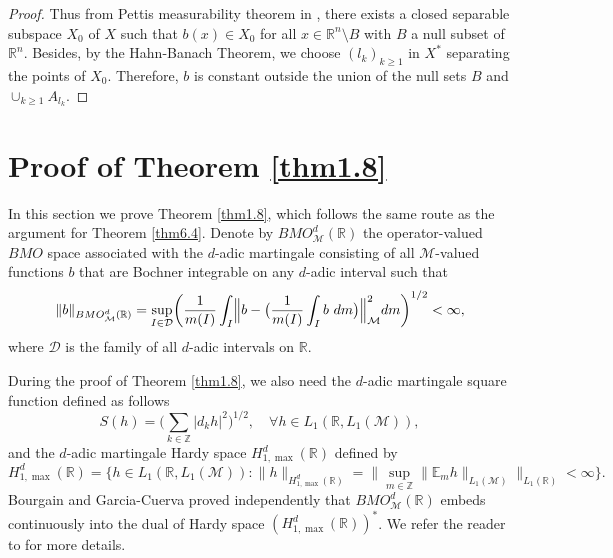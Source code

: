 \documentclass[oneside,english,a4wide]{amsart}
\numberwithin{equation}{section}
\numberwithin{figure}{section}
\theoremstyle{plain}
\theoremstyle{plain}
\theoremstyle{definition}
\theoremstyle{plain}
\theoremstyle{remark}
\theoremstyle{definition}
\theoremstyle{remark}
\theoremstyle{definition}
\newcommand{\8}{\infty}
\begin{document}
\begin{proof}
	Thus from Pettis measurability theorem in \cite[Theorem II.1.2]{DU}, there exists a closed separable subspace $X_0$ of $X$ such that $b(x)\in X_0$ for all $x\in \mathbb{R}^n\setminus B$ with $B$ a null subset of $\mathbb{R}^n$. Besides, by the Hahn-Banach Theorem, we choose $(l_k)_{k\ge 1}$ in $X^*$ separating the points of $X_0$.   Therefore, $b$ is constant outside the union of the null sets $B$ and $\cup_{k\ge 1}A_{l_k}$.
\end{proof}


 

\bigskip

\section{Proof of Theorem \ref{thm1.8}}\label{pthm1.8}

In this section we prove Theorem \ref{thm1.8}, which follows the same route as the argument for Theorem \ref{thm6.4}. Denote by $BMO^d_{\mathcal{M}}(\mathbb{R})$ the operator-valued $BMO$ space associated with the $d$-adic martingale consisting of all $\mathcal{M}$-valued functions $b$ that are Bochner integrable on any $d$-adic interval such that
\begin{equation}\label{BMOMd}
	\|b\|_{BMO^d_\mathcal{M}(\mathbb{R})}=\sup_{I\in \mathcal{D}}\biggl(\frac{1}{m(I)}\int_I \Bigl\|b-\big(\frac{1}{m(I)} \int_I b\ d m\big)\Bigr\|_\mathcal{M}^2 dm\biggr)^{1/2}<\infty,
\end{equation} 
where $\mathcal{D}$ is the family of all $d$-adic intervals on $\mathbb{R}$.

During the proof of Theorem \ref{thm1.8}, we also need the $d$-adic martingale square function defined as follows
\begin{equation*}
	S(h)=\biggl(\sum_{k\in\mathbb{Z}} |d_kh|^2\biggr)^{1/2}, \quad \forall h\in L_1(\mathbb{R},L_1(\mathcal{M})), 
\end{equation*}
and the $d$-adic martingale Hardy space $H^{d}_{1,\max}(\mathbb{R})$ defined by
\begin{equation*}
	H^d_{1,\max}(\mathbb{R})=\bigg\{h\in  L_1(\mathbb{R},L_1(\mathcal{M})):\|h\|_{H^d_{1,\max}(\mathbb{R})}=\bigg\|\sup_{m\in\mathbb{Z}}\|\mathbb{E}_mh\|_{L_1(\mathcal{M})}\bigg\|_{L_1(\mathbb{R})}<\infty\bigg\}.
\end{equation*}
Bourgain and Garcia-Cuerva proved independently that $BMO_\mathcal{M}^d(\mathbb{R})$ embeds continuously into the dual of Hardy space $(	H^d_{1,\max}(\mathbb{R}))^*$. We refer the reader to \cite{BJ} for more details.
\end{document}

